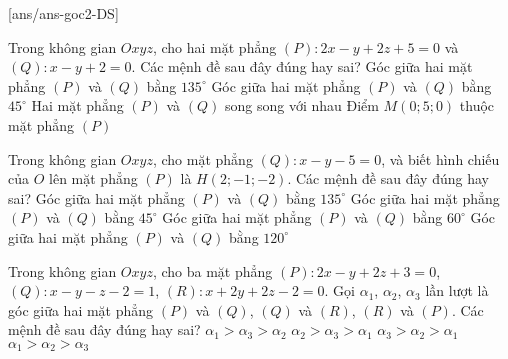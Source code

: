 \TNTF
{}[ans/ans-goc2-DS]
\begin{ex}%
	Trong không gian $Oxyz$, cho hai mặt phẳng $(P)\colon 2x-y+2z+5=0$ và $(Q)\colon x-y+2=0$. Các mệnh đề sau đây đúng hay sai?
	\choiceTF
	{Góc giữa hai mặt phẳng $(P)$ và $(Q)$ bằng $135^\circ$}
	{\True Góc giữa hai mặt phẳng $(P)$ và $(Q)$ bằng $45^\circ$}
	{Hai mặt phẳng $(P)$ và $(Q)$ song song với nhau}
	{\True Điểm $M\left(0;5;0\right)$ thuộc mặt phẳng $(P)$}
\end{ex}
\begin{ex}%
Trong không gian $Oxyz$, cho mặt phẳng $(Q)\colon x-y-5=0$, và biết hình chiếu của $O$ lên mặt phẳng $(P)$ là $H\left(2;-1;-2\right)$. Các mệnh đề sau đây đúng hay sai?
	\choiceTF
{Góc giữa hai mặt phẳng $(P)$ và $(Q)$ bằng $135^\circ$}
{\True Góc giữa hai mặt phẳng $(P)$ và $(Q)$ bằng $45^\circ $}
{Góc giữa hai mặt phẳng $(P)$ và $(Q)$ bằng $60^\circ $}
{Góc giữa hai mặt phẳng $(P)$ và $(Q)$ bằng $120^\circ$}
\end{ex}
\begin{ex}%
	Trong không gian $Oxyz$, cho ba mặt phẳng $(P)\colon 2x-y+2z+3=0$, $(Q)\colon x-y-z-2=1$, $(R)\colon x+2y+2z-2=0$. Gọi $\alpha_1$, $\alpha_2$, $\alpha_3$ lần lượt là góc giữa hai mặt phẳng $(P)$ và $(Q)$, $(Q)$ và $(R)$, $(R)$ và $(P)$. Các mệnh đề sau đây đúng hay sai?
	\choiceTF
	{\True $\alpha_1>\alpha_3>\alpha_2$}
	{$\alpha_2>\alpha_3>\alpha_1$}
	{$\alpha_3>\alpha_2>\alpha_1$}
	{$\alpha_1>\alpha_2>\alpha_3$}
\end{ex}

